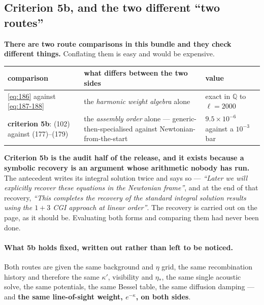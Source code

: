 \subsection{Criterion 5b, and the two different ``two routes''}

\textbf{There are two route comparisons in this bundle and they check
different things.} Conflating them is easy and would be expensive.

\begin{center}\small
\begin{tabularx}{\textwidth}{@{}l >{\raggedright\arraybackslash}X l@{}}
\toprule
\textbf{comparison} & \textbf{what differs between the two sides} & \textbf{value} \\
\midrule
\eqref{eq:186} against \eqref{eq:187-188} & the \emph{harmonic weight algebra}
  alone & exact in $\mathbb Q$ to $\ell=2000$ \\
\textbf{criterion 5b}: (102) against (177)--(179) & the \emph{assembly order}
  alone --- generic-then-specialised against Newtonian-from-the-start &
  $9.5\times10^{-6}$ against a $10^{-3}$ bar \\
\bottomrule
\end{tabularx}
\end{center}

\noindent
\textbf{Criterion 5b is the audit half of the release, and it exists because a
symbolic recovery is an argument whose arithmetic nobody has run.} The
antecedent writes its integral solution twice and says so --- \emph{``Later we
will explicitly recover these equations in the Newtonian frame''}, and at the
end of that recovery, \emph{``This completes the recovery of the standard
integral solution results using the $1+3$ CGI approach at linear order''}. The
recovery is carried out on the page, as it should be. Evaluating both forms and
comparing them had never been done.

\paragraph{What 5b holds fixed, written out rather than left to be noticed.}
Both routes are given the same background and $\eta$ grid, the same
recombination history and therefore the same $\kappa'$, visibility and
$\eta_*$, the same single acoustic solve, the same potentials, the same Bessel
table, the same diffusion damping --- and \textbf{the same line-of-sight
weight, $e^{-\kappa}$, on both sides}.

